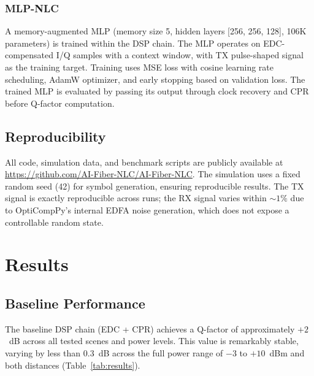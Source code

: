 \documentclass[conference]{IEEEtran}
\begin{document}
\subsubsection{MLP-NLC}
A memory-augmented MLP (memory size 5, hidden layers [256, 256, 128], 106K parameters) is trained within the DSP chain. The MLP operates on EDC-compensated I/Q samples with a context window, with TX pulse-shaped signal as the training target. Training uses MSE loss with cosine learning rate scheduling, AdamW optimizer, and early stopping based on validation loss. The trained MLP is evaluated by passing its output through clock recovery and CPR before Q-factor computation.

\subsection{Reproducibility}
All code, simulation data, and benchmark scripts are publicly available at \url{https://github.com/AI-Fiber-NLC/AI-Fiber-NLC}. The simulation uses a fixed random seed (42) for symbol generation, ensuring reproducible results. The TX signal is exactly reproducible across runs; the RX signal varies within $\sim 1\%$ due to OptiCompPy's internal EDFA noise generation, which does not expose a controllable random state.

\section{Results}

\subsection{Baseline Performance}

The baseline DSP chain (EDC + CPR) achieves a Q-factor of approximately $+2$~dB across all tested scenes and power levels. This value is remarkably stable, varying by less than 0.3~dB across the full power range of $-3$ to $+10$~dBm and both distances (Table~\ref{tab:results}).
\end{document}
